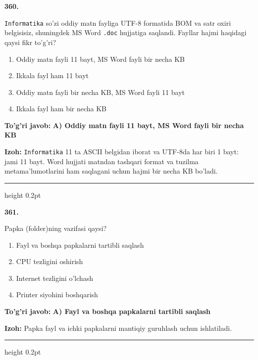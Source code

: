 \documentclass[10pt,a4paper]{article}
\begin{document}
{\bfseries\sffamily\color{ink} 360.}
\par
\texttt{Informatika} so'zi oddiy matn fayliga UTF-8 formatida BOM va satr oxiri belgisisiz, shuningdek MS Word \texttt{.doc} hujjatiga saqlandi. Fayllar hajmi haqidagi qaysi fikr to'g'ri?
\begin{enumerate}[label=\Alph*),leftmargin=9mm]
\item Oddiy matn fayli 11 bayt, MS Word fayli bir necha KB
\item Ikkala fayl ham 11 bayt
\item Oddiy matn fayli bir necha KB, MS Word fayli 11 bayt
\item Ikkala fayl ham bir necha KB
\end{enumerate}
\begin{tcolorbox}[enhanced,breakable,colback=teal!4,colframe=teal!60!black,boxrule=0.45pt,arc=1.2mm,left=2.7mm,right=2.7mm,top=1.8mm,bottom=1.8mm,before skip=2mm,after skip=2mm]
{\bfseries\sffamily\color{teal}To'g'ri javob:} \textbf{A) Oddiy matn fayli 11 bayt, MS Word fayli bir necha KB}
\par\smallskip
{\bfseries Izoh:} \texttt{Informatika} 11 ta ASCII belgidan iborat va UTF-8da har biri 1 bayt: jami 11 bayt. Word hujjati matndan tashqari format va tuzilma metama'lumotlarini ham saqlagani uchun hajmi bir necha KB bo'ladi.
\end{tcolorbox}
\vspace{2mm}\hrule height 0.2pt\vspace{3mm}

{\bfseries\sffamily\color{ink} 361.}
\par
Papka (folder)ning vazifasi qaysi?
\begin{enumerate}[label=\Alph*),leftmargin=9mm]
\item Fayl va boshqa papkalarni tartibli saqlash
\item CPU tezligini oshirish
\item Internet tezligini o'lchash
\item Printer siyohini boshqarish
\end{enumerate}
\begin{tcolorbox}[enhanced,breakable,colback=teal!4,colframe=teal!60!black,boxrule=0.45pt,arc=1.2mm,left=2.7mm,right=2.7mm,top=1.8mm,bottom=1.8mm,before skip=2mm,after skip=2mm]
{\bfseries\sffamily\color{teal}To'g'ri javob:} \textbf{A) Fayl va boshqa papkalarni tartibli saqlash}
\par\smallskip
{\bfseries Izoh:} Papka fayl va ichki papkalarni mantiqiy guruhlash uchun ishlatiladi.
\end{tcolorbox}
\vspace{2mm}\hrule height 0.2pt\vspace{3mm}
\end{document}

